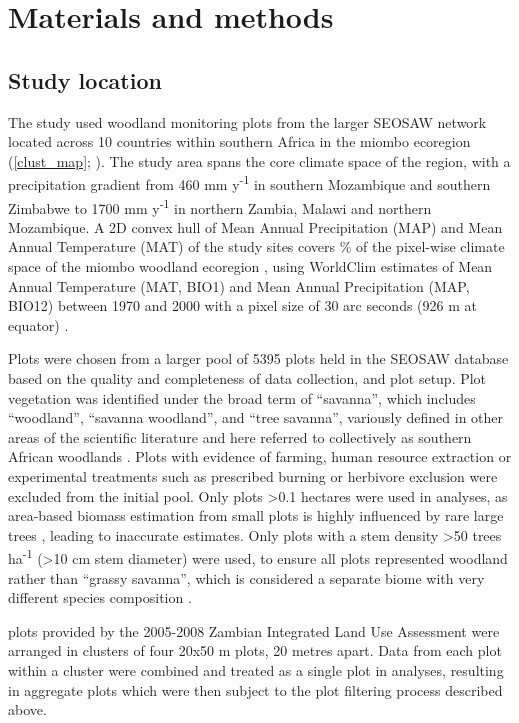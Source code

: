 \documentclass[11pt,a4paper]{article}
\newcommand{\textapprox}{\raisebox{0.5ex}{\texttildelow}}  %
\begin{document}
\section{Materials and methods}

\subsection{Study location}

The study used \nplots{} woodland monitoring plots from the larger SEOSAW network \citep{seosaw_web} located across 10 countries within southern Africa in the miombo ecoregion (\autoref{clust_map}; \citealp{White1987}). The study area spans the core climate space of the region, with a precipitation gradient from \textapprox{}460 mm y\textsuperscript{-1} in southern Mozambique and southern Zimbabwe to \textapprox{}1700 mm y\textsuperscript{-1} in northern Zambia, Malawi and northern Mozambique. A 2D convex hull of Mean Annual Precipitation (MAP) and Mean Annual Temperature (MAT) of the study sites covers \hullcover{}\% of the pixel-wise climate space of the miombo woodland ecoregion \citep{White1987}, using WorldClim estimates of Mean Annual Temperature (MAT, BIO1) and Mean Annual Precipitation (MAP, BIO12) between 1970 and 2000 with a pixel size of 30 arc seconds (926 m at equator) \citep{Fick2017}. 

Plots were chosen from a larger pool of 5395 plots held in the SEOSAW database \citep{seosaw_web} based on the quality and completeness of data collection, and plot setup. Plot vegetation was identified under the broad term of ``savanna'', which includes ``woodland'', ``savanna woodland'', and ``tree savanna'', variously defined in other areas of the scientific literature and here referred to collectively as southern African woodlands \citep{Ratnam2011, Hill2010}. Plots with evidence of farming, human resource extraction or experimental treatments such as prescribed burning or herbivore exclusion were excluded from the initial pool. Only plots >0.1 hectares were used in analyses, as area-based biomass estimation from small plots is highly influenced by rare large trees \citep{Stegen2011}, leading to inaccurate estimates. Only plots with a stem density >50 trees ha\textsuperscript{-1} (>10 cm stem diameter) were used, to ensure all plots represented woodland rather than ``grassy savanna'', which is considered a separate biome with very different species composition \citep{Parr2014}. 

\nzam{} plots provided by the 2005-2008 Zambian Integrated Land Use Assessment \citep{Mukosha2009, Pelletier2018} were arranged in clusters of four 20x50 m plots, 20 metres apart. Data from each plot within a cluster were combined and treated as a single plot in analyses, resulting in \nzamcluster{} aggregate plots which were then subject to the plot filtering process described above.
\end{document}
